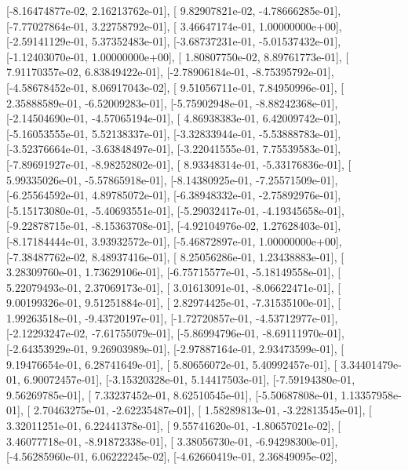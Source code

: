\documentclass{article}
\begin{document}
       [-8.16474877e-02,  2.16213762e-01],
       [ 9.82907821e-02, -4.78666285e-01],
       [-7.77027864e-01,  3.22758792e-01],
       [ 3.46647174e-01,  1.00000000e+00],
       [-2.59141129e-01,  5.37352483e-01],
       [-3.68737231e-01, -5.01537432e-01],
       [-1.12403070e-01,  1.00000000e+00],
       [ 1.80807750e-02,  8.89761773e-01],
       [ 7.91170357e-02,  6.83849422e-01],
       [-2.78906184e-01, -8.75395792e-01],
       [-4.58678452e-01,  8.06917043e-02],
       [ 9.51056711e-01,  7.84950996e-01],
       [ 2.35888589e-01, -6.52009283e-01],
       [-5.75902948e-01, -8.88242368e-01],
       [-2.14504690e-01, -4.57065194e-01],
       [ 4.86938383e-01,  6.42009742e-01],
       [-5.16053555e-01,  5.52138337e-01],
       [-3.32833944e-01, -5.53888783e-01],
       [-3.52376664e-01, -3.63848497e-01],
       [-3.22041555e-01,  7.75539583e-01],
       [-7.89691927e-01, -8.98252802e-01],
       [ 8.93348314e-01, -5.33176836e-01],
       [ 5.99335026e-01, -5.57865918e-01],
       [-8.14380925e-01, -7.25571509e-01],
       [-6.25564592e-01,  4.89785072e-01],
       [-6.38948332e-01, -2.75892976e-01],
       [-5.15173080e-01, -5.40693551e-01],
       [-5.29032417e-01, -4.19345658e-01],
       [-9.22878715e-01, -8.15363708e-01],
       [-4.92104976e-02,  1.27628403e-01],
       [-8.17184444e-01,  3.93932572e-01],
       [-5.46872897e-01,  1.00000000e+00],
       [-7.38487762e-02,  8.48937416e-01],
       [ 8.25056286e-01,  1.23438883e-01],
       [ 3.28309760e-01,  1.73629106e-01],
       [-6.75715577e-01, -5.18149558e-01],
       [ 5.22079493e-01,  2.37069173e-01],
       [ 3.01613091e-01, -8.06622471e-01],
       [ 9.00199326e-01,  9.51251884e-01],
       [ 2.82974425e-01, -7.31535100e-01],
       [ 1.99263518e-01, -9.43720197e-01],
       [-1.72720857e-01, -4.53712977e-01],
       [-2.12293247e-02, -7.61755079e-01],
       [-5.86994796e-01, -8.69111970e-01],
       [-2.64353929e-01,  9.26903989e-01],
       [-2.97887164e-01,  2.93473599e-01],
       [ 9.19476654e-01,  6.28741649e-01],
       [ 5.80656072e-01,  5.40992457e-01],
       [ 3.34401479e-01,  6.90072457e-01],
       [-3.15320328e-01,  5.14417503e-01],
       [-7.59194380e-01,  9.56269785e-01],
       [ 7.33237452e-01,  8.62510545e-01],
       [-5.50687808e-01,  1.13357958e-01],
       [ 2.70463275e-01, -2.62235487e-01],
       [ 1.58289813e-01, -3.22813545e-01],
       [ 3.32011251e-01,  6.22441378e-01],
       [ 9.55741620e-01, -1.80657021e-02],
       [ 3.46077718e-01, -8.91872338e-01],
       [ 3.38056730e-01, -6.94298300e-01],
       [-4.56285960e-01,  6.06222245e-02],
       [-4.62660419e-01,  2.36849095e-02],
\end{document}
